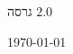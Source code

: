 
\begin{center}
\begin{bfseries}
\bigskip
\bigskip
גרסה
$2.0$

\bigskip

\today

\end{bfseries}
\end{center}
